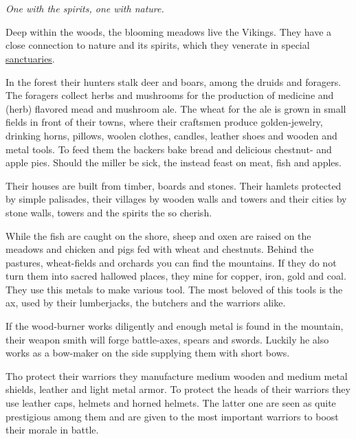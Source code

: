 \section{}\label{ch:Tribes:Vikings}

\begin{flushright}
	\emph{One with the spirits, one with nature.}
\end{flushright}

Deep within the woods, the blooming meadows live the \gls*{Vikings}. They have
a close connection to nature and its spirits, which they venerate in special
\hyperref[ch:Tribes:Vikings:Religion]{sanctuaries}.

In the forest their hunters stalk deer and boars, among the druids and
foragers. The foragers collect herbs and mushrooms for the production of
medicine and (herb) flavored mead and mushroom ale. The wheat for the ale is
grown in small fields in front of their towns, where their craftsmen produce
golden-jewelry, drinking horns, pillows, woolen clothes, candles, leather shoes
and wooden and metal tools. To feed them the backers bake bread and delicious
chestnut- and apple pies. Should the miller be sick, the instead feast on meat,
fish and apples.

Their houses are built from timber, boards and stones. Their hamlets protected
by simple palisades, their villages by wooden walls and towers and their cities
by stone walls, towers and the spirits the so cherish.

While the fish are caught on the shore, sheep and oxen are raised on the
meadows and chicken and pigs fed with wheat and chestnuts. Behind the pastures,
wheat-fields and orchards you can find the mountains. If they do not turn them
into sacred hallowed places, they mine for copper, iron, gold and coal. They
use this metals to make various tool. The most beloved of this tools is the ax,
used by their lumberjacks, the butchers and the warriors alike.

If the wood-burner works diligently and enough metal is found in the mountain,
their weapon smith will forge battle-axes, spears and swords. Luckily he also
works as a bow-maker on the side supplying them with short bows.

Tho protect their warriors they manufacture medium wooden and medium metal
shields, leather and light metal armor. To protect the heads of their warriors
they use leather caps, helmets and horned helmets. The latter one are seen as
quite prestigious among them and are given to the most important warriors to
boost their morale in battle.

